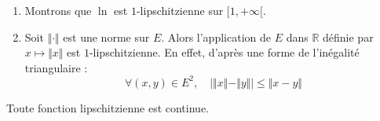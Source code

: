 \documentclass[french,11pt,twoside]{VcCours}
\begin{document}
\begin{Exemples}
\begin{enumerate}
\item Montrons que $\ln$ est $1$-lipschitzienne sur $[1, + \infty[$.

\medskip

\vspace{5cm}
%
\item Soit $\Vert \cdot \Vert$ est une norme sur $E$. Alors l'application de $E$ dans $\mathbb{R}$ définie par $x \mapsto \Vert x \Vert$ est $1$-lipschitzienne. En effet, d'après une forme de l'inégalité triangulaire :
$$ \forall (x,y) \in E^2, \quad \vert \Vert x \Vert - \Vert y \Vert \vert \leq \Vert x -y \Vert $$
\end{enumerate}
\end{Exemples}

\begin{Theoreme}{} Toute fonction lipschitzienne est continue. 
\end{Theoreme}

\begin{Demonstration}{} 
%
%
%

\vspace{4cm}
\end{Demonstration}
\end{document}
